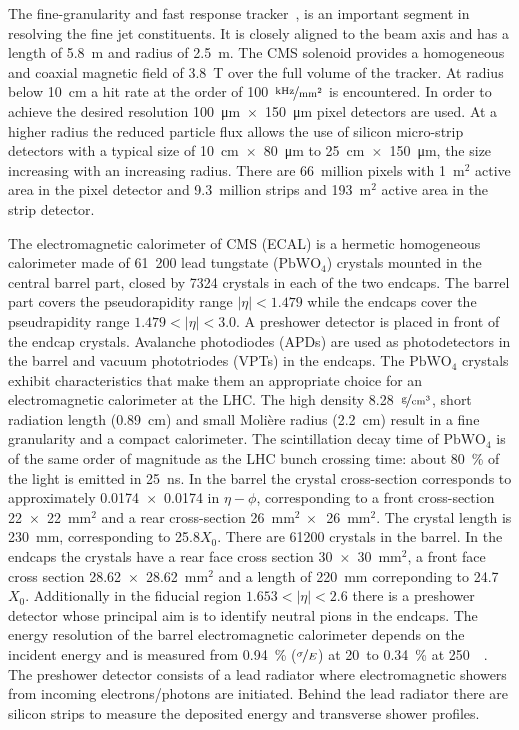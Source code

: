 The fine-granularity and fast response tracker~\cite{Karimaki:368412}, \cite{tracker_addendum} is an important segment in resolving the fine jet constituents. It is closely aligned to the beam axis and has a length of 5.8~m and radius of 2.5~m. The CMS solenoid provides a homogeneous and coaxial magnetic field of 3.8~T over the full volume of the tracker. At radius below 10~cm a hit rate at the order of 100~$\nicefrac{\text{kHz}}{\text{mm}^2}$ is encountered. In order to achieve the desired resolution \SI{100}{\um}~$\times$~\SI{150}{\um} pixel detectors are used. At a higher radius the reduced particle flux allows the use of silicon micro-strip detectors with a typical size of \SI{10}{cm}~$\times$~\SI{80}{\um} to \SI{25}{cm}~$\times$~\SI{150}{\um}, the size increasing with an increasing radius. There are 66~million pixels with 1~$\text{m}^2$ active area in the pixel detector and 9.3~million strips and 193~${\text{m}}^2$ active area in the strip detector.

The electromagnetic calorimeter of CMS (ECAL) is a hermetic homogeneous calorimeter made of 61~200 lead tungstate ($\text{PbWO}_{4}$) crystals mounted in the central barrel part, closed by \num{7324} crystals in each of the two endcaps. The barrel part covers the pseudorapidity range $\left|\eta\right|<1.479$ while the endcaps cover the pseudrapidity range $1.479<\left|\eta\right|<3.0$. A preshower detector is placed in front of the endcap crystals. Avalanche photodiodes (APDs) are used as photodetectors in the barrel and vacuum phototriodes (VPTs) in the endcaps. The $\text{PbWO}_{4}$ crystals exhibit characteristics that make them an appropriate choice for an electromagnetic calorimeter at the LHC. The high density 8.28~$\nicefrac{\text{g}}{\text{cm}^3}$, short radiation length (0.89~cm)  and small Molière radius (2.2~cm) result in a fine granularity and a compact calorimeter. The scintillation decay time of $\text{PbWO}_{4}$ is of the same order of magnitude as the LHC bunch crossing time: about 80~\% of the light is emitted in 25~ns. In the barrel the crystal cross-section corresponds to approximately 0.0174~$\times$~0.0174 in $\eta-\phi$, corresponding to a front cross-section 22~$\times$~22~$\text{mm}^2$ and a rear cross-section 26~$\text{mm}^2~\times$~26~$\text{mm}^2$. The crystal length is 230~mm, corresponding to 25.8$X_{0}$. There are \num{61200} crystals in the barrel. In the endcaps the crystals have a rear face cross section 30~$\times$~30~$\text{mm}^2$, a front face cross section 28.62~$\times$~28.62~$\text{mm}^2$ and a length of 220~mm correponding to 24.7~$X_{0}$. Additionally in the fiducial region $1.653<\left|\eta\right|<2.6$ there is a preshower detector whose principal aim is to identify neutral pions in the endcaps. The energy resolution of the barrel electromagnetic calorimeter depends on the incident energy and is measured from 0.94~\% ($\nicefrac{\sigma}{E}$) at 20~\GeV to 0.34~\% at 250~\GeV~\cite{Adzic:2007mi}. The preshower detector consists of a lead radiator where electromagnetic showers from incoming electrons/photons are initiated. Behind the lead radiator there are silicon strips to measure the deposited energy and transverse shower profiles.

